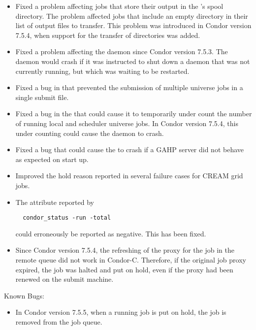 \begin{itemize}
\item Fixed a problem affecting jobs that store their output in the
  's spool directory.  The problem affected jobs that
  include an empty directory in their list of output files to
  transfer.  This problem was introduced in Condor version 7.5.4,
  when support for the transfer of directories was added.

\item Fixed a problem affecting the  daemon since
  Condor version 7.5.3.  
  The  daemon would crash if it was instructed
  to shut down a daemon that was not currently running,
  but which was waiting to be restarted.

\item Fixed a bug in  that prevented the submission of
multiple  universe jobs in a single submit file.

\item Fixed a bug in the  that could cause it to temporarily
under count the number of running local and scheduler universe jobs. 
In Condor version 7.5.4, 
this under counting could cause the daemon to crash.

\item Fixed a bug that could cause the  to crash if
a GAHP server did not behave as expected on start up.

\item Improved the hold reason reported in several failure cases for 
CREAM grid jobs.

\item The  attribute reported by 
\begin{verbatim}
  condor_status -run -total 
\end{verbatim}
could erroneously be reported as negative.  This has been fixed.

\item Since Condor version 7.5.4, the refreshing of the proxy for the job in the
  remote queue did not work in Condor-C.  Therefore, if the original job proxy
  expired, the job was halted and put on hold, even if the proxy had
  been renewed on the submit machine.

\end{itemize}

\noindent Known Bugs:

\begin{itemize}

\item In Condor version 7.5.5, when a running job is put on hold, the job
  is removed from the job queue.

\end{itemize}

